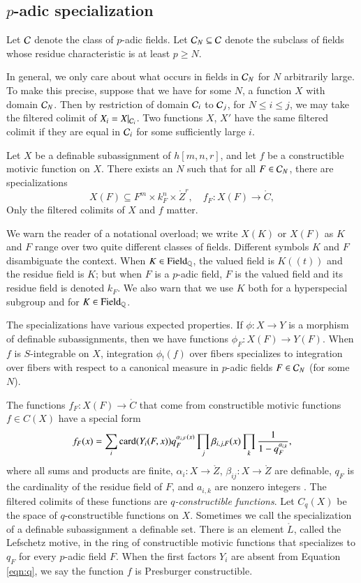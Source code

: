 \subsection{$p$-adic specialization}

Let $\mathcal C$ denote the class of $p$-adic fields.
Let $\mathcal C_N\subseteq \mathcal C$ denote the subclass of fields whose residue characteristic is at least $p\ge N$.

In general, we only care about what occurs in fields in $\mathcal C_N$ for $N$ arbitrarily large.
To make this precise, suppose that we have for some $N$, a function $X$ with domain $\mathcal C_N$.
Then by restriction of domain $\mathcal C_i$ to $\mathcal C_{j}$, for $N\le i\le j$, we may take the filtered colimit of $X_i=X|_{\mathcal C_i}$.
Two functions $X$, $X'$ have the same filtered colimit if they are equal in $\mathcal C_i$ for some sufficiently large $i$.

Let $X$ be a definable subassignment of $h[m,n,r]$, and let $f$ be a constructible motivic function on $X$.   There exists
an $N$ such that for all $F\in \mathcal C_N$, there are specializations
\[
X(F)\subseteq F^m\times k_F^n\times \ring{Z}^r,  \quad f_F: X(F) \to\ring{C},
\]
Only the  filtered colimits of $X$ and $f$ matter.

We warn the reader of a notational overload; we write $X(K)$ or $X(F)$ as $K$ and $F$ range over two quite different
classes of fields.  Different symbols $K$ and $F$  disambiguate the context.
When $K\in {\operatorname{Field}}_{\mathbb{Q}}$, the valued field is $K((t))$ and the residue field is $K$; but when $F$ is a $p$-adic field, $F$
is the valued field and its residue field is denoted $k_F$.  We also warn that
we use $K$ both for a hyperspecial subgroup and for $K\in{\operatorname{Field}}_{\mathbb{Q}}$.

The specializations have various expected properties.
If $\phi:X\to Y$ is a morphism of definable subassignments, then we have functions $\phi_F:X(F)\to Y(F)$.
When $f$ is $S$-integrable on $X$,  integration $\phi_!(f)$ over fibers  specializes to integration over fibers 
with respect to a canonical measure in
 $p$-adic fields $F\in \mathcal C_N$ (for some $N$).


The functions $f_F:X(F)\to\ring{C}$ that come from constructible motivic functions  $f\in C(X)$ have a special form
\begin{equation}\label{eqn:q}
f_F(x) = \sum_i {\operatorname{card}}(Y_i(F,x)) q_F^{\alpha_{i,F}(x)} \prod_j \beta_{i,j,F}(x)\prod_k \frac{1}{1-q_F^{a_{i,k}}},
\end{equation}
where all sums and products are finite, $\alpha_{i}:X\to\ring{Z}$, $\beta_{ij}:X\to\ring{Z}$ are definable, $q_F$
is the  cardinality of the residue field of $F$, and $a_{i,k}$ are nonzero integers \cite[\S2]{cluckers2011btransfer}.
The filtered colimits of these functions are  {\it $q$-constructible functions}.  Let $C_q(X)$ be the space of
$q$-constructible functions on $X$.
Sometimes we call the specialization of a  definable subassignment a definable set.  
There is an element $\ring{L}$, called the Lefschetz motive, in the ring of constructible motivic functions that specializes to $q_F$
for every $p$-adic field $F$.  When the first factors $Y_i$ are absent from Equation \ref{eqn:q}, we say the function $f$
is Presburger constructible.

